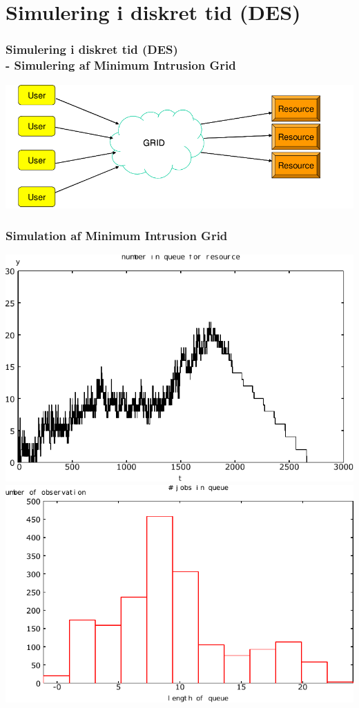 \documentclass[12pt]{beamer}
\begin{document}
\section{Simulering i diskret tid (DES)}
\begin{frame}
  \frametitle{Simulering i diskret tid (DES)\\
-  Simulering af Minimum Intrusion Grid
}
  \includegraphics[scale=0.3]{mig}  
\end{frame}

\begin{frame}
  \frametitle{Simulation af Minimum Intrusion Grid
}
  \includegraphics[scale=0.45]{tidsmodel-1}
  \includegraphics[scale=0.45]{queue}
\end{frame}
\end{document}
